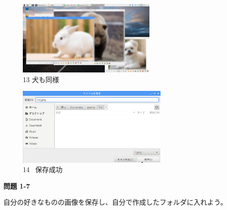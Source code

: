 \documentclass[a4paper,12pt]{jarticle}
\begin{document}
\begin{figure}[t]
  \begin{minipage}{\textwidth}
    \begin{minipage}{7.22cm}
      \includegraphics[width=6.911cm,height=3.729cm]{textbook-img105.png}\\
      13 犬も同様
    \end{minipage}
    \begin{minipage}{2.582cm}
    \end{minipage}
    \begin{minipage}{7.665cm}
      \includegraphics[width=7.527cm,height=3.905cm]{textbook-img104.png}\\
      14 \ 保存成功
    \end{minipage}
  \end{minipage}


  \centering
\end{figure}

\bigskip

{\bfseries
  問題 1-7}

自分の好きなものの画像を保存し、自分で作成したフォルダに入れよう。

\clearpage
\end{document}
